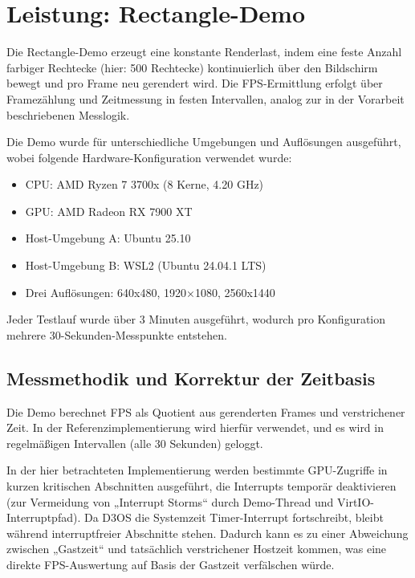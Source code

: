 \clearpage

\section{Leistung: Rectangle-Demo}

Die Rectangle-Demo erzeugt eine konstante Renderlast, indem eine feste Anzahl farbiger Rechtecke (hier: 500 Rechtecke) kontinuierlich über den Bildschirm bewegt und pro Frame neu gerendert wird. Die FPS-Ermittlung erfolgt über Framezählung und Zeitmessung in festen Intervallen, analog zur in der Vorarbeit beschriebenen Messlogik.

Die Demo wurde für unterschiedliche Umgebungen und Auflösungen ausgeführt, wobei folgende Hardware-Konfiguration verwendet wurde:

\begin{itemize}
    \item CPU: AMD Ryzen 7 3700x (8 Kerne, 4.20 GHz)
    \item GPU: AMD Radeon RX 7900 XT
	\item Host-Umgebung A: Ubuntu 25.10
	\item Host-Umgebung B: WSL2 (Ubuntu 24.04.1 LTS)
	\item Drei Auflösungen: 640x480, 1920×1080, 2560x1440
\end{itemize}

Jeder Testlauf wurde über 3 Minuten ausgeführt, wodurch pro Konfiguration mehrere 30-Sekunden-Messpunkte entstehen.

\subsection{Messmethodik und Korrektur der Zeitbasis}

Die Demo berechnet FPS als Quotient aus gerenderten Frames und verstrichener Zeit. In der Referenzimplementierung wird hierfür  verwendet, und es wird in regelmäßigen Intervallen (alle 30 Sekunden) geloggt.

In der hier betrachteten Implementierung werden bestimmte GPU-Zugriffe in kurzen kritischen Abschnitten ausgeführt, die Interrupts temporär deaktivieren (zur Vermeidung von „Interrupt Storms“ durch Demo-Thread und VirtIO-Interruptpfad). Da D3OS die Systemzeit Timer-Interrupt fortschreibt, bleibt  während interruptfreier Abschnitte stehen. Dadurch kann es zu einer Abweichung zwischen „Gastzeit“ und tatsächlich verstrichener Hostzeit kommen, was eine direkte FPS-Auswertung auf Basis der Gastzeit verfälschen würde.

